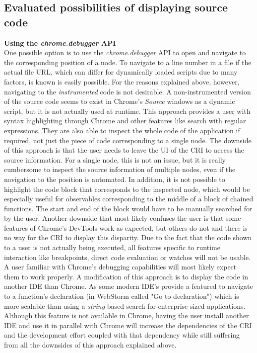 \subsection{Evaluated possibilities of displaying source code}
\noindent\textbf{Using the \emph{chrome.debugger} API}\\
One possible option is to use the \emph{chrome.debugger} API to open and navigate to the corresponding position of a node. To navigate to a line number in a file if the actual file URL, which can differ for dynamically loaded scripts due to many factors, is known is easily possible. For the reasons explained above, however, navigating to the \emph{instrumented} code is not desirable. A non-instrumented version of the source code seems to exist in Chrome's \emph{Source} windows as a dynamic script, but it is not actually used at runtime. This approach provides a user with syntax highlighting through Chrome and other features like search with regular expressions. They are also able to inspect the whole code of the application if required, not just the piece of code corresponding to a single node. The downside of this approach is that the user needs to leave the UI of the CRI to access the source information. For a single node, this is not an issue, but it is really cumbersome to inspect the source information of multiple nodes, even if the navigation to the position is automated. In addition, it is not possible to highlight the code block that corresponds to the inspected node, which would be especially useful for observables corresponding to the middle of a block of chained functions. The start and end of the block would have to be manually searched for by the user. Another downside that most likely confuses the user is that some features of Chrome's DevTools work as expected, but others do not and there is no way for the CRI to display this disparity. Due to the fact that the code shown to a user is not actually being executed, all features specific to runtime interaction like breakpoints, direct code evaluation or watches will not be usable. A user familiar with Chrome's debugging capabilities will most likely expect them to work properly. A modification of this approach is to display the code in another IDE than Chrome. As some modern IDE's provide a featured to navigate to a function's declaration (in WebStorm called "Go to declaration") which is more scalable than using a \emph{string} based search for enterprise-sized applications. Although this feature is not available in Chrome, having the user install another IDE and use it in parallel with Chrome will increase the dependencies of the CRI and the development effort coupled with that dependency while still suffering from all the downsides of this approach explained above.\\

